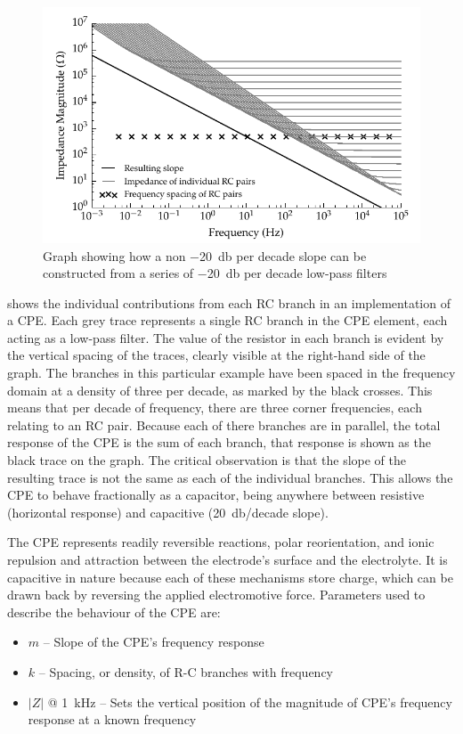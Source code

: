     \begin{figure}
      \centering
      \includegraphics{content/pt2/07-InterfaceModel/graphics/graph_cpe_creation}
      \caption{\label{graph:pt2-cpe_creation}Graph showing how a non \SI{-20}{\decibel} per decade slope can be constructed from a series of \SI{-20}{\decibel} per decade low-pass filters}
    \end{figure}

     shows the individual contributions from each RC branch in an implementation of a CPE.
    Each grey trace represents a single RC branch in the CPE element, each acting as a low-pass filter.
    The value of the resistor in each branch is evident by the vertical spacing of the traces, clearly visible at the right-hand side of the graph.
    The branches in this particular example have been spaced in the frequency domain at a density of three per decade, as marked by the black crosses.
    This means that per decade of frequency, there are three corner frequencies, each relating to an RC pair.
    Because each of there branches are in parallel, the total response of the CPE is the sum of each branch, that response is shown as the black trace on the graph.
    The critical observation is that the slope of the resulting trace is not the same as each of the individual branches.
    This allows the CPE to behave fractionally as a capacitor, being anywhere between resistive (horizontal response) and capacitive (\SI{20}{\decibel}/decade slope).

    The CPE represents readily reversible reactions, polar reorientation, and ionic repulsion and attraction between the electrode's surface and the electrolyte.
    It is capacitive in nature because each of these mechanisms store charge, which can be drawn back by reversing the applied electromotive force.
    Parameters used to describe the behaviour of the CPE are:
    \begin{itemize}
      \item $m$ -- Slope of the CPE's frequency response
      \item $k$ -- Spacing, or density, of R-C branches with frequency
      \item $|Z|$ @ \SI{1}{\kilo\hertz} -- Sets the vertical position of the magnitude of CPE's frequency response at a known frequency
    \end{itemize}

